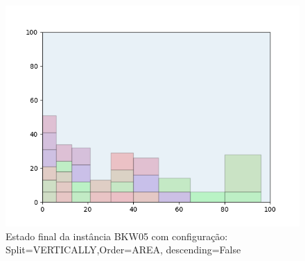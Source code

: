 \begin{figure}[H]
    \centering
    \caption[]{Estado final da instância BKW05 com configuração: Split=VERTICALLY,Order=AREA, descending=False}
    \label{fig:bkw05-vertically-area-false}
    \includegraphics[scale=0.5]{output/figures/bkw/bkw05/vertically/area/false/00}
\end{figure}